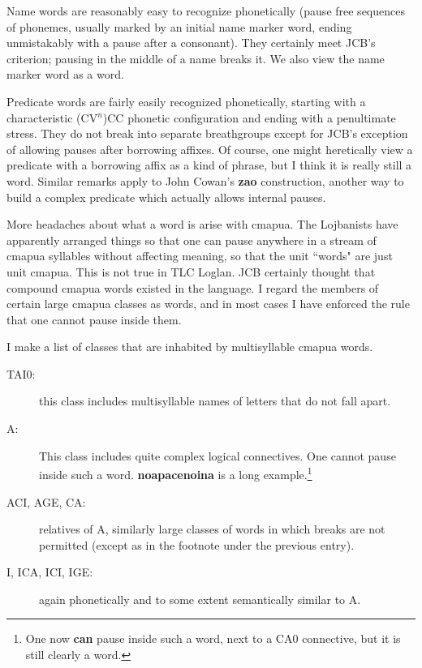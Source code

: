 \documentclass[12pt]{book}
\begin{document}
{Name words are reasonably easy to recognize phonetically (pause free sequences of phonemes, usually marked by an initial name marker word, ending
unmistakably with a pause after a consonant).  They certainly meet JCB's criterion; pausing in the middle of a name breaks it.   We also view the name marker word as a word.

Predicate words are fairly easily recognized phonetically, starting with a characteristic (CV$^n$)CC phonetic configuration and ending with a penultimate stress.  They do not break into separate breathgroups except for JCB's exception of allowing pauses after borrowing affixes.  Of course, one might heretically view a predicate with a borrowing affix as a kind of phrase, but I think it is really still a word.   Similar remarks apply to 
John Cowan's {\bf zao} construction, another way to build a complex predicate which actually allows internal pauses.

More headaches about what a word is arise with cmapua.   The Lojbanists have apparently arranged things so that one can pause anywhere in a stream of cmapua syllables without affecting meaning, so that the unit ``words" are just unit cmapua.  This is not true in TLC Loglan.   JCB certainly thought that compound cmapua words existed in the language.  I regard the members of certain large cmapua classes as words, and in most cases
I have enforced the rule that one cannot pause inside them.  

I make a list of classes that are inhabited by multisyllable cmapua words.

\begin{description}

\item[TAI0:]  this class includes multisyllable names of letters that do not fall apart.

\item[A:]  This class includes quite complex logical connectives.  One cannot pause inside such a word.  {\bf noapacenoina} is a long example.\footnote{One now {\bf can} pause inside such a word, next to a CA0 connective, but it is still clearly a word.}

\item[ACI, AGE, CA:]  relatives of A, similarly large classes of words in which breaks are not permitted (except as in the footnote under the previous entry).

\item[I, ICA, ICI, IGE:]  again phonetically and to some extent semantically similar to A.


\end{description}}
\end{document}
